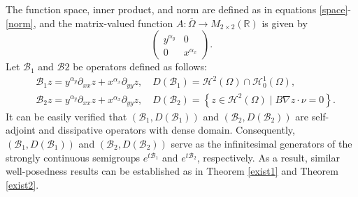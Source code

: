\documentclass[9pt,reqno]{amsart}
\theoremstyle{plain}
\numberwithin{equation}{section}
\numberwithin{theorem}{section}
\def\Om{\Omega}
\DeclareMathOperator*{\Div}{\mathrm{div}}
\def\Om{\Omega}
\def\mcH{\mathcal{H}}
\begin{document}
	The function space, inner product, and norm are defined as in equations \eqref{space}-\eqref{norm}, and the matrix-valued function $A:\overline{\Omega} \to M_{2\times 2}(\mathbb{R})$ is given by
	\begin{equation*}
		\begin{pmatrix} y^{\alpha_y} & 0 \\ 0 &x^{\alpha_x} \end{pmatrix}.
	\end{equation*}
	Let $\mathcal{B}_1$ and $\mathcal{B}2$ be operators defined as follows:
	\begin{equation*}
		\begin{split}
			&\mathcal{B}_1 z= y^{\alpha_y}\partial_{xx}z +x^{\alpha_x}\partial_{yy}z,  \quad D(\mathcal{B}_1) = \mathcal{H}^2 (\Om)\cap \mcH_0^1(\Omega) ,\\
			&\mathcal{B}_2 z= y^{\alpha_y}\partial_{xx}z +x^{\alpha_x}\partial_{yy}z,  \quad D(\mathcal{B}_2) = \left\lbrace z\in \mathcal{H}^2 (\Om) \mid B\nabla z \cdot \nu = 0 \right\rbrace .
		\end{split}
	\end{equation*}
	It can be easily verified that $(\mathcal{B}_1,D(\mathcal{B}_1))$ and $(\mathcal{B}_2,D(\mathcal{B}_2))$ are self-adjoint and dissipative operators with dense domain. Consequently, $(\mathcal{B}_1,D(\mathcal{B}_1))$ and $(\mathcal{B}_2,D(\mathcal{B}_2))$ serve as the infinitesimal generators of the strongly continuous semigroups $e^{t\mathcal{B}_1}$ and $e^{t\mathcal{B}_2}$, respectively. As a result, similar well-posedness results can be established as in Theorem \ref{exist1} and Theorem \ref{exist2}.
	
\end{document}
